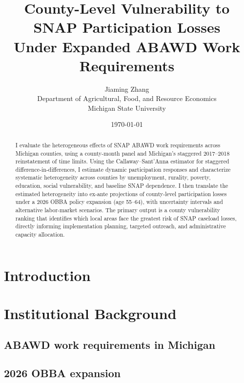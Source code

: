 \documentclass[11pt,a4paper]{article}
\title{County-Level Vulnerability to SNAP Participation Losses\\Under Expanded ABAWD Work Requirements}
\author{Jiaming Zhang \\ Department of Agricultural, Food, and Resource Economics \\ Michigan State University}
\date{\today}
\begin{document}
\maketitle
\begin{abstract}
I evaluate the heterogeneous effects of SNAP ABAWD work requirements across Michigan counties, using a county-month panel and Michigan's staggered 2017--2018 reinstatement of time limits. Using the Callaway--Sant'Anna estimator for staggered difference-in-differences, I estimate dynamic participation responses and characterize systematic heterogeneity across counties by unemployment, rurality, poverty, education, social vulnerability, and baseline SNAP dependence. I then translate the estimated heterogeneity into ex-ante projections of county-level participation losses under a 2026 OBBA policy expansion (age 55--64), with uncertainty intervals and alternative labor-market scenarios. The primary output is a county vulnerability ranking that identifies which local areas face the greatest risk of SNAP caseload losses, directly informing implementation planning, targeted outreach, and administrative capacity allocation.
\end{abstract}

\section{Introduction}
\label{sec:intro}

\section{Institutional Background}
\label{sec:background}

\subsection{ABAWD work requirements in Michigan}

\subsection{2026 OBBA expansion}
\end{document}
